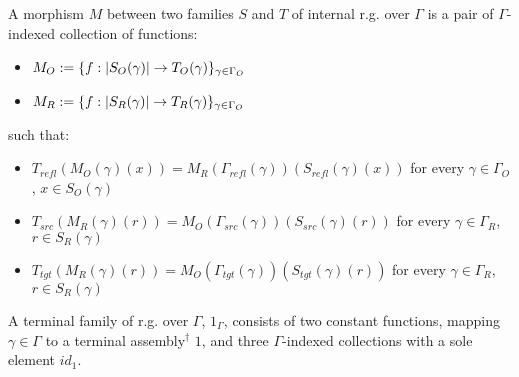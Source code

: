 \documentclass[12pt,a4paper]{article}
\def\cAsm{\mathcal{A}\mathit{sm}^\dagger}
\def\src{_{src}}\alwaysmath{src}
\def\rfl{_{refl}}\alwaysmath{rfl}
\def\tgt{_{tgt}}\alwaysmath{tgt}
\renewcommand{\O}{_{O}}
\newcommand{\R}{\ensuremath{_{R}}}
\begin{document}
A morphism $M$ between two families $S$ and $T$ of internal r.g. over $\Gamma$ is a pair of $\Gamma$-indexed collection of functions:
\begin{itemize}[noitemsep]
  \item $M\O \define \{f : \carr{S\O(\gamma)} \to T\O(\gamma) \}_{\gamma \in \Gamma\O}$
  \item $M\R \define \{f : \carr{S\R(\gamma)} \to T\R(\gamma) \}_{\gamma \in \Gamma\O}$
\end{itemize}
such that:
\begin{itemize}[noitemsep]
  \item $T\rfl(M\O (\gamma)(x)) = M\R(\Gamma\rfl(\gamma))(S\rfl(\gamma)(x))$ for every $\gamma \in \Gamma\O$, $x \in S\O(\gamma)$
  \item $T\src(M\R (\gamma)(r)) = M\O(\Gamma\src(\gamma))(S\src(\gamma)(r))$ for every $\gamma \in \Gamma\R$, $r \in S\R(\gamma)$
  \item $T\tgt(M\R (\gamma)(r)) = M\O(\Gamma\tgt(\gamma))(S\tgt(\gamma)(r))$ for every $\gamma \in \Gamma\R$, $r \in S\R(\gamma)$
  
\end{itemize}

A terminal family of r.g. over $\Gamma$, $1_\Gamma$,  consists of two constant functions, mapping $\gamma\in\Gamma$ to a terminal assembly$^\dagger$ $1$, and three $\Gamma$-indexed collections with a sole element $id_1$.

\end{document}

